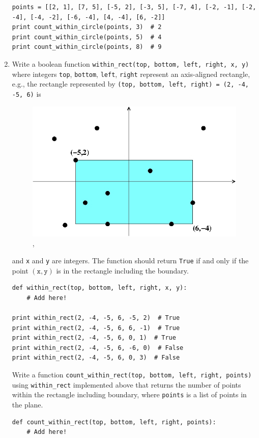 \documentclass[../main.tex]{subfiles}
\begin{document}
\begin{enumerate}
\begin{verbatim}
points = [[2, 1], [7, 5], [-5, 2], [-3, 5], [-7, 4], [-2, -1], [-2, -4], [-4, -2], [-6, -4], [4, -4], [6, -2]]
print count_within_circle(points, 3)  # 2
print count_within_circle(points, 5)  # 4
print count_within_circle(points, 8)  # 9
\end{verbatim}

\item Write a boolean function \texttt{within\_rect(top, bottom, left, right, x, y)} where integers \texttt{top}, \texttt{bottom}, \texttt{left}, \texttt{right} represent an axis-aligned rectangle, e.g., the rectangle represented by \texttt{(top, bottom, left, right) = (2, -4, -5, 6)} is
\begin{figure}[H]
\centering
\includegraphics[width=0.5\linewidth]{"./lectures/lecture4_q11"},
\label{fig:lecture4q11}
\end{figure}
and \texttt{x} and \texttt{y} are integers.
The function should return \texttt{True} if and only if the point $(\texttt{x}, \texttt{y})$ is in the rectangle including the boundary.
\begin{verbatim}
def within_rect(top, bottom, left, right, x, y):
    # Add here!

print within_rect(2, -4, -5, 6, -5, 2)  # True
print within_rect(2, -4, -5, 6, 6, -1)  # True
print within_rect(2, -4, -5, 6, 0, 1)  # True
print within_rect(2, -4, -5, 6, -6, 0)  # False
print within_rect(2, -4, -5, 6, 0, 3)  # False
\end{verbatim}
Write a function \texttt{count\_within\_rect(top, bottom, left, right, points)} using \texttt{within\_rect} implemented above that returns the number of points within the rectangle including boundary, where \texttt{points} is a list of points in the plane.
\begin{verbatim}
def count_within_rect(top, bottom, left, right, points):
    # Add here!


\end{verbatim}
\end{enumerate}
\end{document}
